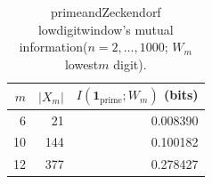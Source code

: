 \begin{table}[H]
\centering
\scriptsize
\setlength{\tabcolsep}{6pt}
\caption{primeandZeckendorf lowdigitwindow's mutual information($n=2,\dots,1000$; $W_m$ lowest$m$ digit).}
\label{tab:prime_shadow_window_mi}
\begin{tabular}{r r r}
\toprule
$m$ & $|X_m|$ & $I(\mathbf{1}_{\mathrm{prime}};W_m)$ (bits)\\
\midrule
6 & 21 & 0.008390\\
10 & 144 & 0.100182\\
12 & 377 & 0.278427\\
\bottomrule
\end{tabular}
\end{table}
